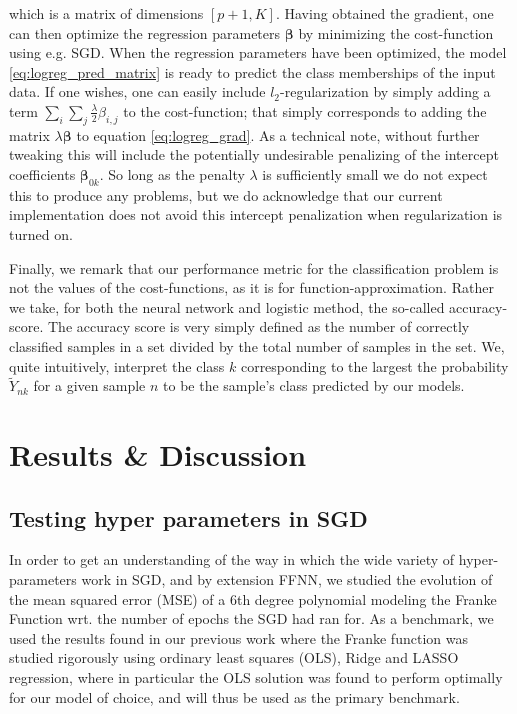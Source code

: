 \documentclass[reprint, english, nofootinbib]{revtex4-2}
\begin{document}
which is a matrix of dimensions $[p+1, K]$. Having obtained the gradient, one can then optimize the regression parameters $\mathbf{\beta}$ by minimizing the cost-function using e.g. SGD. When the regression parameters have been optimized, the model \ref{eq:logreg_pred_matrix} is ready to predict the class memberships of the input data. If one wishes, one can easily include $l_2$-regularization by simply adding a term $\sum_{i} \sum_{j} \frac{\lambda}{2} \beta_{i,j}$ to the cost-function; that simply corresponds to adding the matrix $\lambda \mathbf{\beta}$ to equation \ref{eq:logreg_grad}. As a technical note, without further tweaking this will include the potentially undesirable penalizing of the intercept coefficients $\mathbf{\beta}_{0k}$. So long as the penalty $\lambda$ is sufficiently small we do not expect this to produce any problems, but we do acknowledge that our current implementation does not avoid this intercept penalization when regularization is turned on.

Finally, we remark that our performance metric for the classification problem is not the values of the cost-functions, as it is for function-approximation. Rather we take, for both the neural network and logistic method, the so-called accuracy-score. The accuracy score is very simply defined as the number of correctly classified samples in a set divided by the total number of samples in the set. We, quite intuitively,  interpret the class $k$ corresponding to the largest the probability $\tilde{Y}_{nk}$ for a given sample $n$ to be the sample's class predicted by our models.


\section{Results \& Discussion}
\subsection{Testing hyper parameters in SGD}
\noindent
In order to get an understanding of the way in which the wide variety of hyper-parameters work in SGD, and by extension FFNN, we studied the evolution of the mean squared error (MSE) of a $6$th degree polynomial modeling the Franke Function wrt. the number of epochs the SGD had ran for. As a benchmark, we used the results found in our previous work \cite{4155_project_1} where the Franke function was studied rigorously using ordinary least squares (OLS), Ridge and LASSO regression, where in particular the OLS solution was found to perform optimally for our model of choice, and will thus be used as the primary benchmark.
\end{document}
